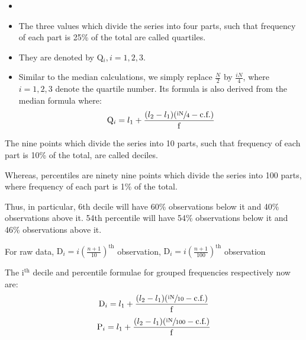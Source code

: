 \documentclass[
10pt, %
a4paper, %
]{report}
\begin{document}
\begin{description}
\item[Quartiles]
\begin{itemize}
\item[]
\item The three values which divide the series into four parts, such that frequency of each part is 25\% of the total are called quartiles.
\item They are denoted by Q\(_i, i = 1, 2, 3\).
\item Similar to the median calculations, we simply replace \(\frac{N}{2}\) by \(\frac{iN}{4}\), where \(i = 1, 2, 3\) denote the quartile number. Its formula is also derived from the median formula where:
\[
\mathrm{Q}_i = l_1 + \dfrac{(l_2 - l_1)(\sfrac{\mathrm{iN}}{4} - \text{c.f.})}{\mathrm{f}}
\]
\end{itemize}
\item[Deciles and Percentiles]
\item The nine points which divide the series into 10 parts, such that frequency of each part is 10\% of the total, are called deciles.
\item Whereas, percentiles are ninety nine points which divide the series into 100 parts, where frequency of each part is 1\% of the total.
\item Thus, in particular, 6th decile will have 60\% observations below it and 40\% observations above it. 54th percentile will have 54\% observations below it and 46\% observations above it.
\item For raw data,
\(
\mathrm{D}_i = i\left(\frac{n+1}{10}\right)^\text{th}
\) observation,
\(
\mathrm{D}_i = i\left(\frac{n+1}{100}\right)^\text{th}
\) observation
\item The i\(^\text{th}\) decile and percentile formulae for grouped frequencies respectively now are:
\[
\mathrm{D}_i = l_1 + \dfrac{(l_2 - l_1)(\sfrac{\mathrm{iN}}{10} - \text{c.f.})}{\mathrm{f}}
\]
\[
\mathrm{P}_i = l_1 + \dfrac{(l_2 - l_1)(\sfrac{\mathrm{iN}}{100} - \text{c.f.})}{\mathrm{f}}
\]
\end{description}
\end{document}
